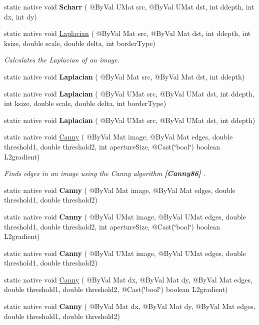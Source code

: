 \begin{DoxyCompactItemize}
\item 
static native void {\bfseries Scharr} ( @By\+Val U\+Mat src, @By\+Val U\+Mat dst, int ddepth, int dx, int dy)
\item 
static native void \hyperlink{group__imgproc__filter_ga223106fa434e6e5dee1974eab81bbf26}{Laplacian} ( @By\+Val Mat src, @By\+Val Mat dst, int ddepth, int ksize, double scale, double delta, int border\+Type)
\begin{DoxyCompactList}\small\item\em Calculates the Laplacian of an image. \end{DoxyCompactList}\item 
static native void {\bfseries Laplacian} ( @By\+Val Mat src, @By\+Val Mat dst, int ddepth)
\item 
static native void {\bfseries Laplacian} ( @By\+Val U\+Mat src, @By\+Val U\+Mat dst, int ddepth, int ksize, double scale, double delta, int border\+Type)
\item 
static native void {\bfseries Laplacian} ( @By\+Val U\+Mat src, @By\+Val U\+Mat dst, int ddepth)
\item 
static native void \hyperlink{group__imgproc__feature_gae85c4c5d2fd8006e4194e3ee73d2277d}{Canny} ( @By\+Val Mat image, @By\+Val Mat edges, double threshold1, double threshold2, int aperture\+Size, @Cast(\char`\"{}bool\char`\"{}) boolean L2gradient)
\begin{DoxyCompactList}\small\item\em Finds edges in an image using the Canny algorithm {\bfseries [Canny86]} . \end{DoxyCompactList}\item 
static native void {\bfseries Canny} ( @By\+Val Mat image, @By\+Val Mat edges, double threshold1, double threshold2)
\item 
static native void {\bfseries Canny} ( @By\+Val U\+Mat image, @By\+Val U\+Mat edges, double threshold1, double threshold2, int aperture\+Size, @Cast(\char`\"{}bool\char`\"{}) boolean L2gradient)
\item 
static native void {\bfseries Canny} ( @By\+Val U\+Mat image, @By\+Val U\+Mat edges, double threshold1, double threshold2)
\item 
static native void \hyperlink{group__imgproc__feature_ga64af31e287f8de7a4fd3ee87c522add9}{Canny} ( @By\+Val Mat dx, @By\+Val Mat dy, @By\+Val Mat edges, double threshold1, double threshold2, @Cast(\char`\"{}bool\char`\"{}) boolean L2gradient)
\item 
static native void {\bfseries Canny} ( @By\+Val Mat dx, @By\+Val Mat dy, @By\+Val Mat edges, double threshold1, double threshold2)

\end{DoxyCompactItemize}
